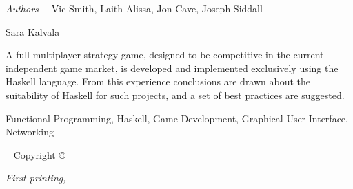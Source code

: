 

\frontmatter

%


\maketitle


\newpage
\begin{fullwidth}
	{\large {\it Authors\ \ } Vic Smith, Laith Alissa, Jon Cave, Joseph Siddall
	
	\vspace{1em} Sara Kalvala
	
	\vspace{1em} A full multiplayer strategy game, designed to be competitive in the current independent game market, is developed and implemented exclusively using the Haskell language. From this experience conclusions are drawn about the suitability of Haskell for such projects, and a set of best practices are suggested. 
	
	\vspace{1em} Functional Programming, Haskell, Game Development, Graphical User Interface, Networking
	
	}
	
	~\vfill
	\thispagestyle{empty}
	\setlength{\parindent}{0pt}
	\setlength{\parskip}{\baselineskip}
	Copyright \copyright\ \the\year\ \plainauthor
	
	\par{}
	
	
	\par\textit{First printing, \monthyear}

	\newpage

\end{fullwidth}


